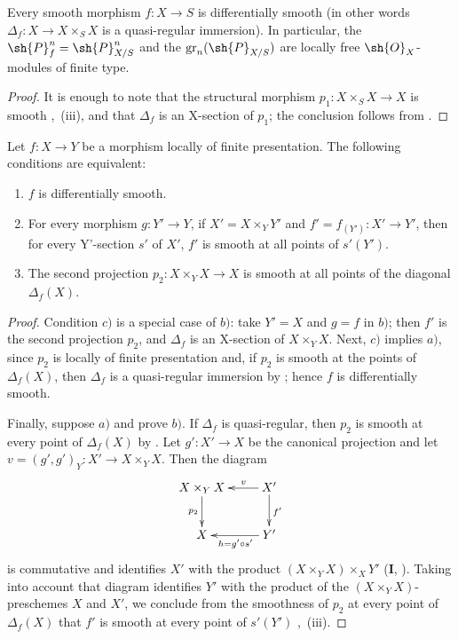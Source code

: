 \begin{proposition}[17.12.4]
\label{IV.17.12.4}
Every smooth morphism $f:X\to S$ is differentially smooth (in other words  $\Delta_f:X\to X\times_S X$ is a quasi-regular immersion).
In particular, the $\sh{P}^n_f=\sh{P}^n_{X/S}$ and the $\operatorname{gr}_n(\sh{P}_{X/S})$ are locally free $\sh{O}_X$-modules of finite type.
\end{proposition}

\begin{proof}
It is enough to note that the structural morphism $p_1:X\times_S X\to X$ is smooth ,~(iii), and that $\Delta_f$ is an X-section of $p_1$; the conclusion follows from .
\end{proof}

\begin{proposition}[17.12.5]
\label{IV.17.12.5}
Let $f:X\to Y$ be a morphism locally of finite presentation.
The following conditions are equivalent:
\begin{enumerate}
  \item[a)] $f$ is differentially smooth.
  \item[b)] For every morphism $g:Y'\to Y$, if $X'=X\times_Y Y'$ and $f'=f_{(Y')}:X'\to Y'$, then for every Y'-section $s'$ of $X'$, $f'$ is smooth at all points of $s'(Y')$.
  \item[c)] The second projection $p_2:X\times_Y X\to X$ is smooth at all points of the diagonal $\Delta_f(X)$.
\end{enumerate}
\end{proposition}


\begin{proof}
Condition $c)$ is a special case of $b)$: take $Y'=X$ and $g=f$ in $b)$; then $f'$ is the second projection $p_2$, and $\Delta_f$ is an X-section of $X\times_Y X$.
Next, $c)$ implies $a)$, since $p_2$ is locally of finite presentation and, if $p_2$ is smooth at the points of $\Delta_f(X)$, then $\Delta_f$ is a quasi-regular immersion by ; hence $f$ is differentially smooth.

Finally, suppose $a)$ and prove $b)$.
If $\Delta_f$ is quasi-regular, then $p_2$ is smooth at every point of $\Delta_f(X)$ by .
Let $g':X'\to X$ be the canonical projection and let
$v=(g',g')_Y:X'\to X\times_Y X$.
Then the diagram
\[
\xymatrix{
  X\times_Y X \ar[d]_{p_2} & X' \ar[l]_-v \ar[d]^{f'}\\
  X & Y' \ar[l]^{h=g'\circ s'}
}
\]
is commutative and identifies $X'$ with the product
$(X\times_Y X)\times_XY'$ ($\mathbf{I}$, ).
Taking into account that diagram  identifies $Y'$ with the product of the $(X\times_Y X)$-preschemes $X$ and $X'$, we conclude from the smoothness of $p_2$ at every point of $\Delta_f(X)$ that $f'$ is smooth at every point of $s'(Y')$ ,~(iii).
\end{proof}

